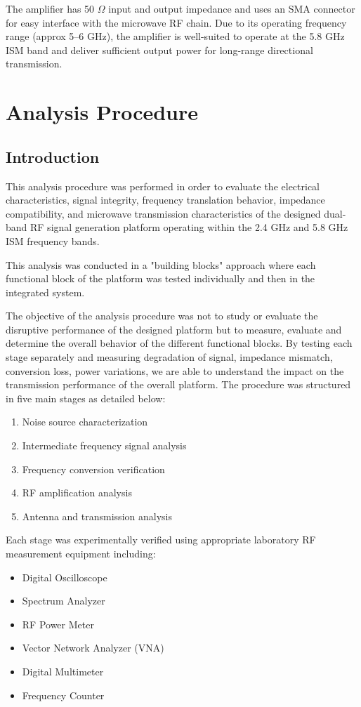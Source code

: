 \documentclass[12pt,a4paper]{report}
\begin{document}
	The amplifier has 50 $\Omega$ input and output impedance and uses an SMA connector for easy interface with the microwave RF chain. Due to its operating frequency range (approx 5--6 GHz), the amplifier is well-suited to operate at the 5.8 GHz ISM band and deliver sufficient output power for long-range directional transmission.
	\section{Analysis Procedure}
	
	\subsection{Introduction}
	This analysis procedure was performed in order to evaluate the electrical characteristics, signal integrity, frequency translation behavior, impedance compatibility, and microwave transmission characteristics of the designed dual-band RF signal generation platform operating within the 2.4 GHz and 5.8 GHz ISM frequency bands.
	
	This analysis was conducted in a "building blocks" approach where each functional block of the platform was tested individually and then in the integrated system.
	
	The objective of the analysis procedure was not to study or evaluate the disruptive performance of the designed platform but to measure, evaluate and determine the overall behavior of the different functional blocks. By testing each stage separately and measuring degradation of signal, impedance mismatch, conversion loss, power variations, we are able to understand the impact on the transmission performance of the overall platform. The procedure was structured in five main stages as detailed below:
	\begin{enumerate}
		\item Noise source characterization
		\item Intermediate frequency signal analysis
		\item Frequency conversion verification
		\item RF amplification analysis
		\item Antenna and transmission analysis
	\end{enumerate}
	
	Each stage was experimentally verified using appropriate laboratory RF measurement equipment including:
	\begin{itemize}
		\item Digital Oscilloscope
		\item Spectrum Analyzer
		\item RF Power Meter
		\item Vector Network Analyzer (VNA)
		\item Digital Multimeter
		\item Frequency Counter
	\end{itemize}
	
\end{document}
